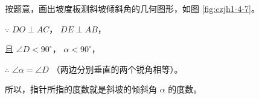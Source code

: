 \jie 按题意，画出坡度板测斜坡倾斜角的几何图形，如图 \ref{fig:czjh1-4-7}。

$\because$ \quad $DO \perp AC$， $DE \perp AB$，

且 \quad $\angle D < 90^\circ$， $\alpha < 90^\circ$，

$\therefore$ \quad $\angle \alpha = \angle D$ （两边分别垂直的两个锐角相等）。

所以，指针所指的度数就是斜坡的倾斜角 $\alpha$ 的度数。



\begin{lianxi}




\end{lianxi}


